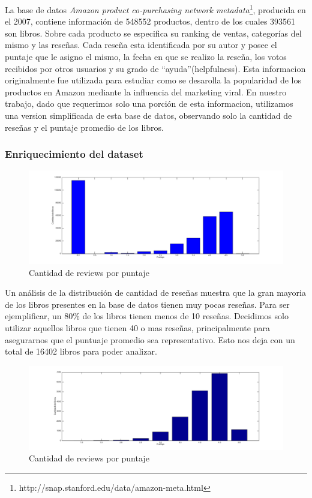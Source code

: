 \documentclass[12pt,journal,compsoc]{IEEEtran}
\begin{document}
La base de datos \textit{Amazon product co-purchasing network metadata}\footnote{http://snap.stanford.edu/data/amazon-meta.html}, producida en el 2007, contiene información de 548552 productos, dentro de los cuales 393561 son libros. Sobre cada producto se especifica su ranking de ventas, categorías del mismo y las reseñas. Cada reseña esta identificada por su autor y posee el puntaje que le asigno el mismo, la fecha en que se realizo la reseña, los votos recibidos por otros usuarios y su grado de ``ayuda''(helpfulness). Esta informacion originalmente fue utilizada para estudiar como se desarolla la popularidad de los productos en Amazon mediante la influencia del marketing viral\cite{leskovec}. En nuestro trabajo, dado que requerimos solo una porción de esta informacion, utilizamos una version simplificada de esta base de datos, observando solo la cantidad de reseñas y el puntaje promedio de los libros.

\subsubsection{Enriquecimiento del dataset}

\begin{figure}[H]
  \includegraphics[width=7.0in]{imgs/cantDeLibrosVsPuntje-crudo.png}
  \caption{Cantidad de reviews por puntaje}
\end{figure} 

Un análisis de la distribución de cantidad de reseñas muestra que la gran mayoria de los libros presentes en la base de datos tienen muy pocas reseñas. Para ser ejemplificar, un 80\% de los libros tienen menos de 10 reseñas. Decidimos solo utilizar aquellos libros que tienen 40 o mas reseñas, principalmente para asegurarnos que el puntuaje promedio sea representativo. Esto nos deja con un total de 16402 libros para poder analizar.

\begin{figure}[H]
  \includegraphics[width=7.0in]{imgs/cantidadDeLibrosVsPuntaje.png}
  \caption{Cantidad de reviews por puntaje}
\end{figure} 
\end{document}
